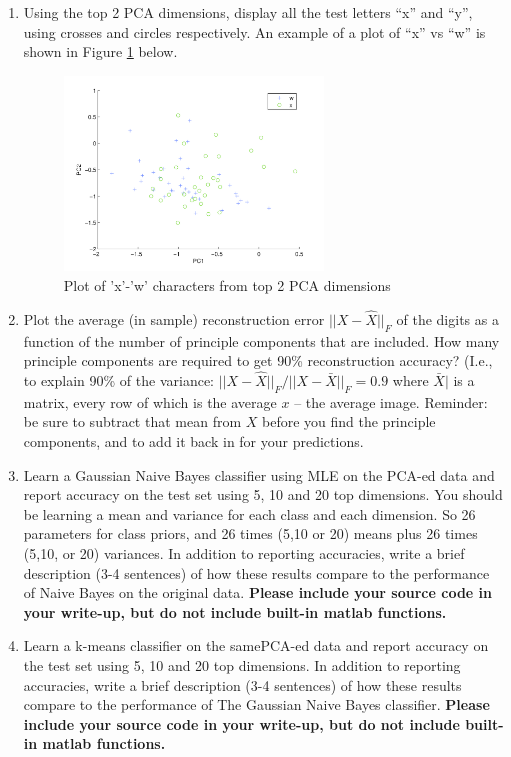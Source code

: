 \begin{enumerate}
\item {} Using the top 2 PCA dimensions, display all the test
  letters ``x'' and ``y'', using crosses and circles respectively.
  An example of a plot of ``x'' vs ``w'' is shown in Figure
  \ref{fig:pca_xw} below.

  \begin{figure}[h!]
    \centering
    \includegraphics[width=0.65\textwidth]{images/pca_x_w}
    \caption{Plot of 'x'-'w' characters from top 2 PCA
        dimensions}\label{fig:pca_xw}
  \end{figure}
  
\item {} Plot the average (in sample) reconstruction error  $||X - \hat{X}||_F$
of the digits as a function of the number of principle components that are included.  How many
principle components are required to get 90\% reconstruction accuracy? (I.e., to explain 90\% of the 
variance:  $||X - \hat{X}||_F/ ||X - \bar{X}||_F = 0.9$  where $\bar{X}|$ is a matrix, every row of which is the
average $x$ -- the average image.  Reminder: be sure to subtract that mean from $X$ before you find the principle components, 
and to add it back in for your predictions.


\item {} Learn a Gaussian Naive Bayes classifier using MLE on
  the PCA-ed data and report accuracy on the test set using 5, 10 and
  20 top dimensions.  You should be learning a mean and variance for
  each class and each dimension.  So 26 parameters for class priors,
  and 26 times (5,10 or 20) means plus 26 times (5,10, or 20)
  variances.  In addition to reporting accuracies, write a brief
  description (3-4 sentences) of how these results compare to the
  performance of Naive Bayes on the original data. {\bf Please include your
    source code in your write-up, but do not include built-in matlab functions.}


\item {} Learn a k-means classifier on
  the samePCA-ed data and report accuracy on the test set using 5, 10 and
  20 top dimensions.  In addition to reporting accuracies, write a brief
  description (3-4 sentences) of how these results compare to the
  performance of The Gaussian Naive Bayes classifier. {\bf Please include your
    source code in your write-up, but do not include built-in matlab functions.}

\end{enumerate}

